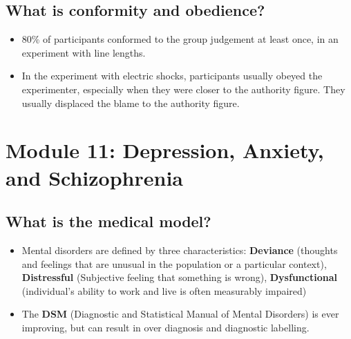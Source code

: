 \documentclass[10pt,letter]{article}
\theoremstyle{plain}
\theoremstyle{definition}
\begin{document}
\subsection*{What is conformity and obedience?}
\begin{itemize}
    \item 80\% of participants conformed to the group judgement at least once, in an experiment with line lengths. 
    \item In the experiment with electric shocks, participants usually obeyed the experimenter, especially when they were closer to the authority figure. They usually displaced the blame to the authority figure. 
\end{itemize}

\section*{Module 11: Depression, Anxiety, and Schizophrenia}
\subsection*{What is the medical model?}
\begin{itemize}
    \item Mental disorders are defined by three characteristics: \textbf{Deviance} (thoughts and feelings that are unusual in the population or a particular context), \textbf{Distressful} (Subjective feeling that something is wrong), \textbf{Dysfunctional} (individual's ability to work and live is often measurably impaired)
    \item The \textbf{DSM} (Diagnostic and Statistical Manual of Mental Disorders) is ever improving, but can result in over diagnosis and diagnostic labelling. 
\end{itemize}
\end{document}
